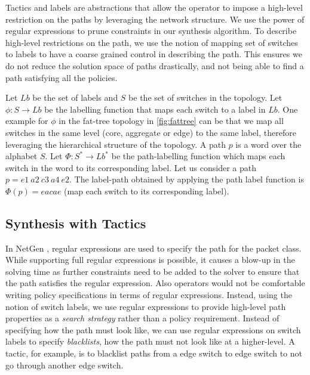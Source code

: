 Tactics and labels are abstractions that allow the operator to impose a high-level restriction on the paths by leveraging the network structure. We use the power of regular expressions to prune constraints in our synthesis algorithm. To describe high-level restrictions on the path, we use the notion of mapping set of switches to labels to have a coarse grained control in describing the path. This ensures we do not reduce the solution space of paths drastically, and not being able to find a path satisfying all the policies.

 Let $Lb$ be the set of labels and $S$ be the set of switches in the topology. Let $\phi : S \rightarrow Lb$ be the labelling function that maps each switch to a label in $Lb$. One example for $\phi$ in the fat-tree topology in \cref{fig:fattree} can be that we map all switches in the same level (core, aggregate or edge) to the same label,
therefore leveraging the hierarchical structure of the topology. A path $p$ is a word over the alphabet $S$. Let $\Phi : S^* \rightarrow Lb^*$ be the path-labelling function which maps each switch in the word to its corresponding label. Let us consider a path $p = e1\ a2\ c3\ a4\ e2$. The label-path obtained by applying the path label function is $\Phi(p) = eacae$ (map each switch to its corresponding label).

\subsection{Synthesis with Tactics}
In NetGen \cite{netgen}, regular expressions are used to specify the path for the packet class.
While supporting full regular expressions is possible, it causes a blow-up in the solving time as further
constraints need to be added to the solver to ensure that the path satisfies the regular expression. Also operators would not be comfortable writing policy specifications in terms of regular expressions. Instead, using the notion of switch labels, we use regular expressions to provide high-level path properties as a {\em search strategy} rather than a policy requirement. Instead of specifying how the path must look like, we can use regular expressions on switch labels to specify \emph{blacklists}, how the path must not look like at a higher-level. A tactic, for example, is to blacklist paths from a edge switch to edge switch to not go through another edge switch. 
 
